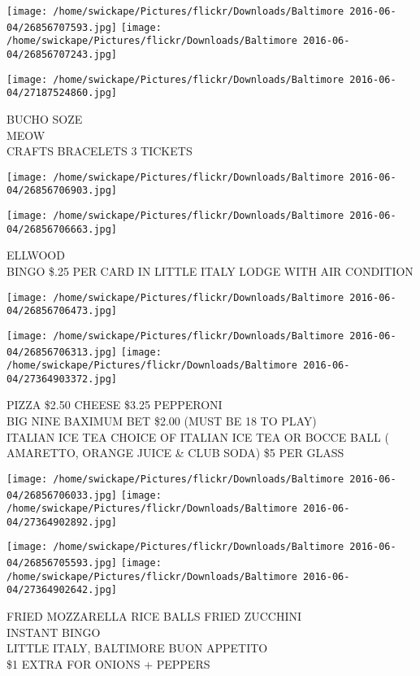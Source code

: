 \documentclass[10pt,letterpaper]{article}
\begin{document}
\texttt{[image: /home/swickape/Pictures/flickr/Downloads/Baltimore 2016-06-04/26856707593.jpg]}
\texttt{[image: /home/swickape/Pictures/flickr/Downloads/Baltimore 2016-06-04/26856707243.jpg]}

\texttt{[image: /home/swickape/Pictures/flickr/Downloads/Baltimore 2016-06-04/27187524860.jpg]}

BUCHO SOZE\\
MEOW\\
CRAFTS BRACELETS 3 TICKETS
\pagebreak

\texttt{[image: /home/swickape/Pictures/flickr/Downloads/Baltimore 2016-06-04/26856706903.jpg]}

\vspace{0.25in}
\texttt{[image: /home/swickape/Pictures/flickr/Downloads/Baltimore 2016-06-04/26856706663.jpg]}

ELLWOOD\\
BINGO \$.25 PER CARD IN LITTLE ITALY LODGE WITH AIR CONDITION
\pagebreak

\texttt{[image: /home/swickape/Pictures/flickr/Downloads/Baltimore 2016-06-04/26856706473.jpg]}

\vspace{0.25in}
\texttt{[image: /home/swickape/Pictures/flickr/Downloads/Baltimore 2016-06-04/26856706313.jpg]}
\texttt{[image: /home/swickape/Pictures/flickr/Downloads/Baltimore 2016-06-04/27364903372.jpg]}

PIZZA \$2.50 CHEESE \$3.25 PEPPERONI\\
BIG NINE BAXIMUM BET \$2.00 (MUST BE 18 TO PLAY)\\
ITALIAN ICE TEA CHOICE OF ITALIAN ICE TEA OR BOCCE BALL ( AMARETTO, ORANGE JUICE \& CLUB SODA) \$5 PER GLASS
\pagebreak

\texttt{[image: /home/swickape/Pictures/flickr/Downloads/Baltimore 2016-06-04/26856706033.jpg]}
\texttt{[image: /home/swickape/Pictures/flickr/Downloads/Baltimore 2016-06-04/27364902892.jpg]}

\texttt{[image: /home/swickape/Pictures/flickr/Downloads/Baltimore 2016-06-04/26856705593.jpg]}
\texttt{[image: /home/swickape/Pictures/flickr/Downloads/Baltimore 2016-06-04/27364902642.jpg]}

FRIED MOZZARELLA RICE BALLS FRIED ZUCCHINI\\
INSTANT BINGO\\
LITTLE ITALY, BALTIMORE BUON APPETITO\\
\$1 EXTRA FOR ONIONS + PEPPERS
\pagebreak
\end{document}
